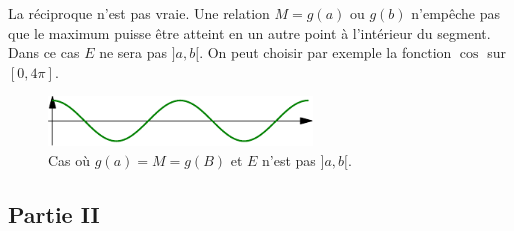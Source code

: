 \begin{enumerate}
\begin{enumerate}
 La r{\'e}ciproque n'est pas vraie. Une relation $M=g(a)$ ou $g(b)$ n'emp{\^e}che pas que le maximum puisse {\^e}tre atteint en un autre point {\`a} l'int{\'e}rieur du segment. Dans ce cas $E$ ne sera pas $]a,b[ $. On peut choisir par exemple la fonction $\cos$ sur $[0,4\pi]$.
\begin{figure}[ht]
\centering
\includegraphics[width=7cm]{Clebesg_5.pdf}
\caption{Cas où $g(a)= M = g(B)$ et  $E$ n'est pas $]a,b[$.}
\end{figure}
\end{enumerate}
\end{enumerate}

\subsection*{Partie II}
